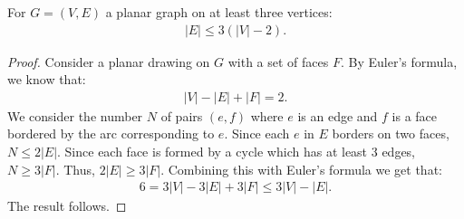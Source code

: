 For $G = (V, E)$ a planar graph on at least three vertices: \begin{gather*}
  |E| \leq 3(|V| - 2).
\end{gather*}
\begin{proof}
    Consider a planar drawing on $G$ with a set of faces $F$. By Euler's formula,
    we know that: \begin{gather*}
        |V| - |E| + |F| = 2.
    \end{gather*} We consider the number $N$ of pairs $(e, f)$ where
    $e$ is an edge and $f$ is a face bordered by the arc corresponding to $e$.
    Since each $e$ in $E$ borders on two faces, $N \leq 2|E|$. Since each face is
    formed by a cycle which has at least 3 edges, $N \geq 3|F|$. Thus, 
    $2|E| \geq 3|F|$. Combining this with Euler's formula we get that: \begin{gather*}
        6 = 3|V| - 3|E| + 3|F| \leq 3|V| - |E|.
    \end{gather*} The result follows.
\end{proof}